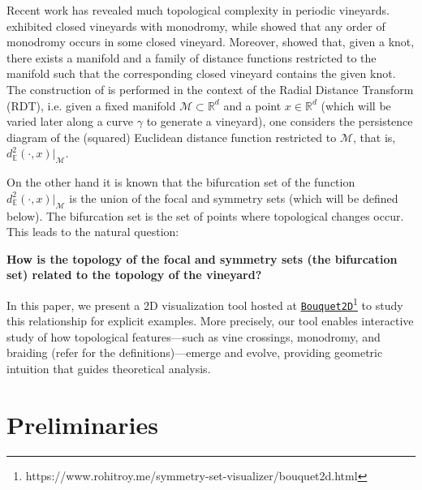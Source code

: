 \documentclass[a4paper,english,numberwithinsect]{eurocg26}
\newcommand{\M}{\mathcal{M}}
\begin{document}
Recent work has revealed much topological complexity in periodic vineyards. \cite{Arya2024} exhibited closed vineyards with monodromy, while \cite{chambers2025braidingvineyards} showed that any order of monodromy occurs in some closed vineyard. 
Moreover, \cite{chambers2025braidingvineyards} showed that, given a knot, there exists a manifold and a family of distance functions restricted to the manifold such that the corresponding closed vineyard contains the given knot. { The construction of \cite{chambers2025braidingvineyards} is performed in the context of the Radial Distance Transform (RDT), i.e. given a fixed manifold $\M\subset \mathbb{R}^d$ and a point $x \in \mathbb{R}^d$ (which will be varied later along a curve $\gamma$ to generate a vineyard), one considers the persistence diagram of the (squared) Euclidean distance function restricted to $\M$, that is, $d_\mathbb{E}^2  (\cdot , x) |_{\M}$.  } 




{On the other hand it is known \cite{Bruce1985symmetry,porteous1971normal} that the bifurcation set of the function $d_\mathbb{E}^2  (\cdot , x) |_{\M}$ is the union of the focal and symmetry sets (which will be defined below). The bifurcation set is the set of points where topological changes occur. This leads to the natural question: 

\textbf{How is the topology of the focal and symmetry sets (the bifurcation set) related to the topology of the vineyard? }
} 

In this paper, we present a 2D visualization tool hosted at \href{https://www.rohitroy.me/symmetry-set-visualizer/bouquet2d.html}{\texttt{Bouquet2D}}\footnote{https://www.rohitroy.me/symmetry-set-visualizer/bouquet2d.html} to study this relationship for explicit examples. %
More precisely, our tool enables interactive study of how topological features—such as vine crossings, monodromy, and braiding (refer \cite{chambers2025braidingvineyards} for the definitions)—emerge and evolve, providing geometric intuition that guides theoretical analysis.

\section{Preliminaries}
\end{document}
